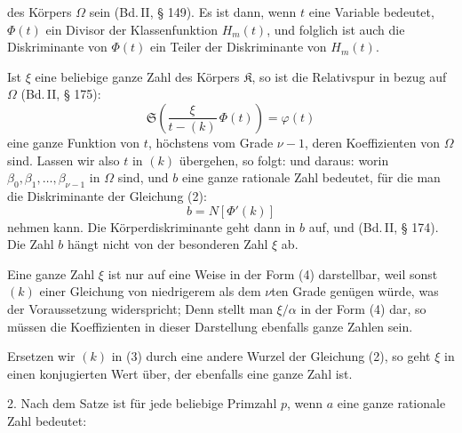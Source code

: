
des Körpers $\Omega$ sein (Bd.\,II, § 149). Es ist dann, wenn $t$ eine Variable bedeutet, $\Phi(t)$ ein Divisor der Klassenfunktion $H_m(t)$, und folglich ist auch die Diskriminante von $\Phi(t)$ ein Teiler der Diskriminante von $H_m(t)$.

Ist $\xi$ eine beliebige ganze Zahl des Körpers $\mathfrak{K}$, so ist die Relativspur in bezug auf $\Omega$ (Bd.\,II, § 175):
\[
\mathfrak{S}\left(\frac{\xi}{t-(k)}\,\Phi(t)\right) = \varphi(t)
\]
eine ganze Funktion von $t$, höchstens vom Grade $\nu-1$, deren Koeffizienten  von $\Omega$ sind. Lassen wir also $t$ in $(k)$ übergehen, so folgt:
und daraus:
worin $\beta_0, \beta_1, \ldots, \beta_{\nu-1}$  in $\Omega$ sind, und $b$ eine ganze rationale Zahl bedeutet, für die man die Diskriminante der Gleichung (2):
\[
b = N[\Phi'(k)]
\]
nehmen kann. Die Körperdiskriminante geht dann in $b$ auf, und  (Bd.\,II, § 174). Die Zahl $b$ hängt nicht von der besonderen Zahl $\xi$ ab.

Eine ganze Zahl $\xi$ ist nur auf eine Weise in der Form (4) darstellbar, weil sonst $(k)$ einer Gleichung von niedrigerem als dem $\nu$ten Grade genügen würde, was der Voraussetzung widerspricht;  Denn stellt man $\xi/\alpha$ in der Form (4) dar, so müssen die Koeffizienten in dieser Darstellung ebenfalls ganze Zahlen sein.

Ersetzen wir $(k)$ in (3) durch eine andere Wurzel der Gleichung (2), so geht $\xi$ in einen konjugierten Wert über, der ebenfalls eine ganze Zahl ist.

2. Nach dem  Satze ist für jede beliebige Primzahl $p$, wenn $a$ eine ganze rationale Zahl bedeutet:
